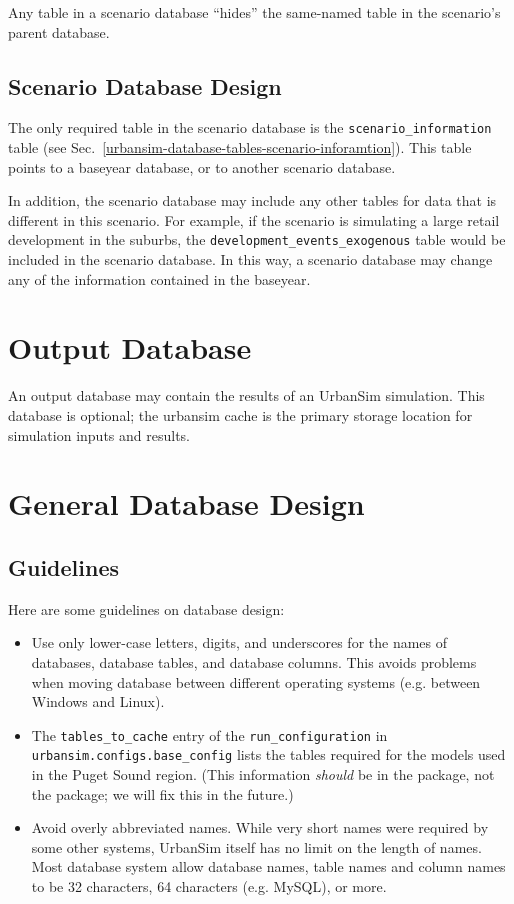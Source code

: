 Any table in a scenario database ``hides'' the same-named table in the
scenario's parent database.

\subsection{Scenario Database Design}

The only required table in the scenario database is the
\verb|scenario_information| table (see Sec.~\ref{urbansim-database-tables-scenario-inforamtion}).
This table points to a baseyear database, or
to another scenario database.

In addition, the scenario database may include any other tables for data that
is different in this scenario. For example, if the scenario is simulating a
large retail development in the suburbs, the \verb|development_events_exogenous| table
would be included in the scenario database.  In this way, a scenario database
may change any of the information contained in the baseyear.

\section{Output Database}

An output database may contain the results of an UrbanSim simulation.  This
database is optional; the urbansim cache is the primary storage location for
simulation inputs and results.

\section{General Database Design}

\subsection{Guidelines}

Here are some guidelines on database design:

\begin{itemize}
\item Use only lower-case letters, digits, and underscores for the names of
databases, database tables, and database columns. This avoids problems when
moving database between different operating systems (e.g. between Windows \windowsindex and
Linux). \linuxindex
\item The \verb|tables_to_cache| entry of the \verb|run_configuration| in
\verb|urbansim.configs.base_config| lists the tables required for the models \modelsindex used in
the Puget Sound region.  (This information \emph{should} be in the
 \psrcindex package, not the  package; we will fix this in
the future.)
\item Avoid overly abbreviated names.  While very short names were required by
some other systems, UrbanSim itself has no limit on the length of names. Most
database system allow database names, table names and column names to be 32
characters, 64 characters (e.g. MySQL), \mysqlindex or more.
\end{itemize}

